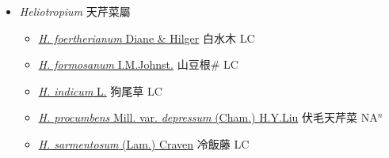 
  \begin{itemize}
 \item[] \textit{Heliotropium} 天芹菜屬
                    
  \begin{itemize}
        \item[] \href{http://www.theplantlist.org/tpl1.1/search?q=Heliotropium+foertherianum}{\textit{H. foertherianum} Diane \& Hilger}     白水木 LC
        \item[] \href{http://www.theplantlist.org/tpl1.1/search?q=Heliotropium+formosanum}{\textit{H. formosanum} I.M.Johnst.}   山豆根\# LC
        \item[] \href{http://www.theplantlist.org/tpl1.1/search?q=Heliotropium+indicum}{\textit{H. indicum} L.}   狗尾草 LC
        \item[] \href{http://www.theplantlist.org/tpl1.1/search?q=Heliotropium+procumbens+var.+depressum}{\textit{H. procumbens} Mill. var. \textit{depressum} (Cham.) H.Y.Liu}   伏毛天芹菜 NA$^n$
        \item[] \href{http://www.theplantlist.org/tpl1.1/search?q=Heliotropium+sarmentosum}{\textit{H. sarmentosum} (Lam.) Craven}     冷飯藤 LC
  \end{itemize}
  \end{itemize}
